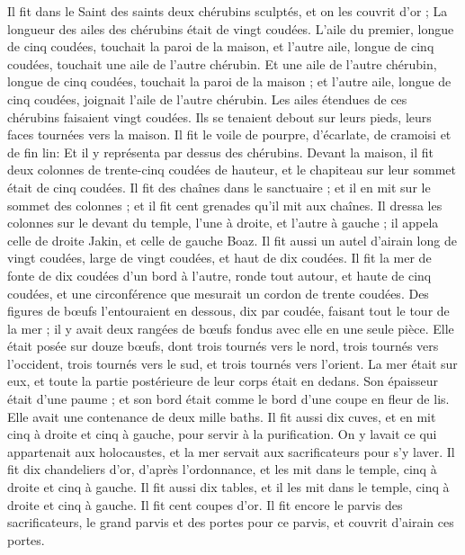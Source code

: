 \begin{multicols}{2}
Il fit dans le Saint des saints deux chérubins sculptés, et on les couvrit d'or ;
La longueur des ailes des chérubins était de vingt coudées. L’aile du premier, longue de cinq coudées, touchait la paroi de la maison, et l'autre aile, longue de cinq coudées, touchait une aile de l'autre chérubin.
Et une aile de l'autre chérubin, longue de cinq coudées, touchait la paroi de la maison ; et l'autre aile, longue de cinq coudées, joignait l'aile de l'autre chérubin.
Les ailes étendues de ces chérubins faisaient vingt coudées. Ils se tenaient debout sur leurs pieds, leurs faces tournées vers la maison.
Il fit le voile de pourpre, d'écarlate, de cramoisi et de fin lin: Et il y représenta par dessus des chérubins.
Devant la maison, il fit deux colonnes de trente-cinq coudées de hauteur, et le chapiteau sur leur sommet était de cinq coudées.
Il fit des chaînes dans le sanctuaire ; et il en mit sur le sommet des colonnes ; et il fit cent grenades qu'il mit aux chaînes.
Il dressa les colonnes sur le devant du temple, l'une à droite, et l'autre à gauche ; il appela celle de droite Jakin, et celle de gauche Boaz.
\VerseOne{}Il fit aussi un autel d'airain long de vingt coudées, large de vingt coudées, et haut de dix coudées.
Il fit la mer de fonte de dix coudées d'un bord à l'autre, ronde tout autour, et haute de cinq coudées, et une circonférence que mesurait un cordon de trente coudées.
Des figures de bœufs l'entouraient en dessous, dix par coudée, faisant tout le tour de la mer ; il y avait deux rangées de bœufs fondus avec elle en une seule pièce.
Elle était posée sur douze bœufs, dont trois tournés vers le nord, trois tournés vers l'occident, trois tournés vers le sud, et trois tournés vers l'orient. La mer était sur eux, et toute la partie postérieure de leur corps était en dedans.
Son épaisseur était d'une paume ; et son bord était comme le bord d'une coupe en fleur de lis. Elle avait une contenance de deux mille baths.
Il fit aussi dix cuves, et en mit cinq à droite et cinq à gauche, pour servir à la purification. On y lavait ce qui appartenait aux holocaustes, et la mer servait aux sacrificateurs pour s'y laver.
Il fit dix chandeliers d'or, d’après l’ordonnance, et les mit dans le temple, cinq à droite et cinq à gauche.
Il fit aussi dix tables, et il les mit dans le temple, cinq à droite et cinq à gauche. Il fit cent coupes d'or.
Il fit encore le parvis des sacrificateurs, le grand parvis et des portes pour ce parvis, et couvrit d'airain ces portes.

\end{multicols}
